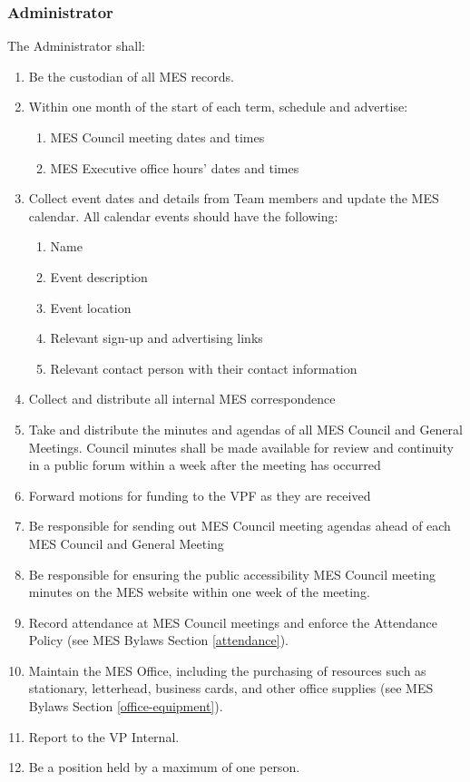 
\subsubsection{Administrator}
\label{administrator}
The Administrator shall:

\begin{enumerate}
 \item
  Be the custodian of all MES records.
 \item
  Within one month of the start of each term, schedule and advertise:

  \begin{enumerate}
   \item
    MES Council meeting dates and times
   \item
    MES Executive office hours' dates and times
  \end{enumerate}
 \item
  Collect event dates and details from Team members and update the MES calendar. All calendar events should have the following:

  \begin{enumerate}
   \item
    Name
   \item
    Event description
   \item
    Event location
   \item
    Relevant sign-up and advertising links
   \item
    Relevant contact person with their contact information
  \end{enumerate}
 \item
  Collect and distribute all internal MES correspondence
 \item
  Take and distribute the minutes and agendas of all MES Council and General Meetings. Council minutes shall be made available for review and continuity in a public forum within a week after the meeting has occurred
 \item
  Forward motions for funding to the VPF as they are received
 \item
  Be responsible for sending out MES Council meeting agendas ahead of each MES Council and General Meeting
 \item
  Be responsible for ensuring the public accessibility MES Council meeting minutes on the MES website within one week of the meeting.
 \item
  Record attendance at MES Council meetings and enforce the Attendance Policy (see MES Bylaws Section \ref{attendance}).
 \item
  Maintain the MES Office, including the purchasing of resources such as stationary, letterhead, business cards, and other office supplies (see MES Bylaws Section \ref{office-equipment}).
 \item
  Report to the VP Internal.
 \item
  Be a position held by a maximum of one person.

\end{enumerate}
